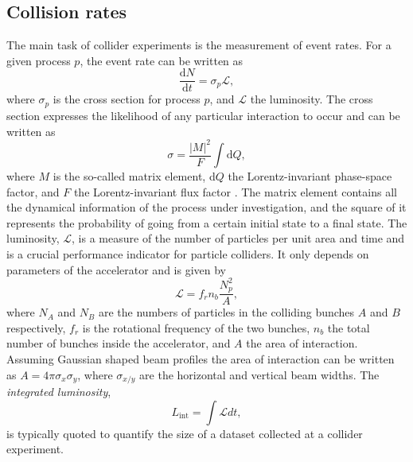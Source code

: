 \subsection{Collision rates}
\label{subsec:collision-rates}
The main task of collider experiments is the measurement of event rates. 
For a given process $p$, the event rate can be written as
\begin{equation}
  \frac{\mathrm{d}N}{\mathrm{d}t} = \sigma_p \mathcal{L},
\end{equation}
where $\sigma_p$ is the cross section for process $p$, and $\mathcal{L}$ the luminosity.
The cross section expresses the likelihood of any particular interaction to occur and can be written as
\begin{equation}
  \label{eq:xsec}
  \sigma = \frac{|M|^2}{F} \int \text{d}Q,
\end{equation}
where $M$ is the so-called matrix element, d$Q$ the Lorentz-invariant phase-space factor, and $F$ the Lorentz-invariant flux factor \cite{Halzen:1984mc}. 
The matrix element contains all the dynamical information of the process under investigation, and the square of it represents the probability of going from a certain initial state to a final state. 
The luminosity, $\mathcal{L}$, is a measure of the number of particles per unit area and time and is a crucial performance indicator for particle colliders. It only depends on parameters of the accelerator and is given by
\begin{equation}
  \mathcal{L} = f_rn_b\frac{N_p^2}{A},
\end{equation}
where $N_A$ and $N_B$ are the numbers of particles in the colliding bunches $A$ and $B$ respectively, $f_r$ is the rotational frequency of the two bunches, $n_b$ the total number of bunches inside the accelerator, and $A$ the area of interaction. Assuming Gaussian shaped beam profiles the area of interaction can be written as $A = 4\pi \sigma_x \sigma_y$, where $\sigma_{x/y}$ are the horizontal and vertical beam widths.
The \emph{integrated luminosity}, 
\begin{equation}
  L_\text{int} = \int \mathcal{L} dt,
\end{equation}
is typically quoted to quantify the size of a dataset collected at a collider experiment.


